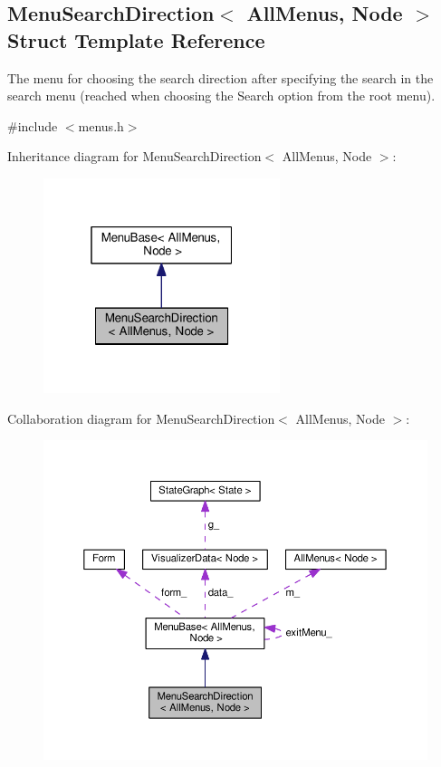 \hypertarget{structMenuSearchDirection}{}\subsection{Menu\+Search\+Direction$<$ All\+Menus, Node $>$ Struct Template Reference}
\label{structMenuSearchDirection}


The menu for choosing the search direction after specifying the search in the search menu (reached when choosing the Search option from the root menu).  




{\ttfamily \#include $<$menus.\+h$>$}



Inheritance diagram for Menu\+Search\+Direction$<$ All\+Menus, Node $>$\+:\nopagebreak
\begin{figure}[H]
\begin{center}
\leavevmode
\includegraphics[width=196pt]{structMenuSearchDirection__inherit__graph}
\end{center}
\end{figure}


Collaboration diagram for Menu\+Search\+Direction$<$ All\+Menus, Node $>$\+:\nopagebreak
\begin{figure}[H]
\begin{center}
\leavevmode
\includegraphics[width=350pt]{structMenuSearchDirection__coll__graph}
\end{center}
\end{figure}
